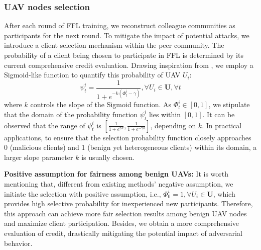 \documentclass[lettersize,journal]{IEEEtran}
\begin{document}
\subsubsection{UAV nodes selection}
After each round of FFL training, we reconstruct colleague communities as participants for the next round. To mitigate the impact of potential attacks, we introduce a client selection mechanism within the peer community. The probability of a client being chosen to participate in FFL is determined by its current comprehensive credit evaluation. Drawing inspiration from \cite{zhou2022defta}, we employ a Sigmoid-like function to quantify this probability of UAV $U_i$:
\begin{equation}
\psi^{i}_t=\frac{1}{1+e^{-k (\Phi^{i}_{t}-\gamma)}},\forall U_i \in \mathbf{U}, \forall t
\end{equation}
where $k$ controls the slope of the Sigmoid function. As $\Phi^{i}_{t}\in [0,1]$, we stipulate that the domain of the probability function $\psi^{i}_t$ lies within $[0,1]$. It can be observed that the range of $\psi^{i}_t$ is $[\frac{1}{1+e^{\gamma k}},\frac{1}{1+e^{-\gamma k}}]$, depending on $k$. In practical applications, to ensure that the selection probability function closely approaches 0 (malicious clients) and 1 (benign yet heterogeneous clients) within its domain, a larger slope parameter $k$ is usually chosen.


\textbf{Positive assumption for fairness among benign UAVs:} It is worth mentioning that, different from existing methods' negative assumption, we initiate the selection with positive assumption, i.e., $\Phi^{i}_{0}=1 ,\forall U_i\in \mathbf{U}$, which provides high selective probability for inexperienced new participants. Therefore, this approach can achieve more fair selection results among benign UAV nodes and maximize client participation. Besides, we obtain a more comprehensive evaluation of credit, drastically mitigating the potential impact of adversarial behavior.
\end{document}
